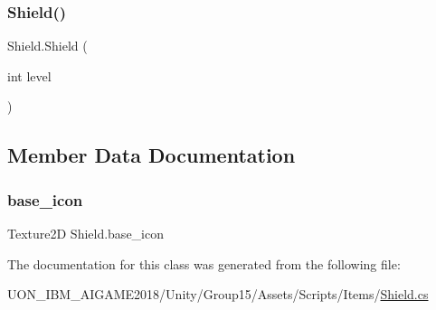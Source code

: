 \subsubsection{\texorpdfstring{Shield()}{Shield()}}
{\footnotesize\ttfamily Shield.\+Shield (\begin{DoxyParamCaption}\item[{int}]{level }\end{DoxyParamCaption})\hspace{0.3cm}{\ttfamily [inline]}}



\subsection{Member Data Documentation}
\mbox{\label{class_shield_ad5d63280a29e5ddd4a42d34533372e33}} 
\subsubsection{\texorpdfstring{base\_icon}{base\_icon}}
{\footnotesize\ttfamily Texture2D Shield.\+base\+\_\+icon\hspace{0.3cm}{\ttfamily [static]}}



The documentation for this class was generated from the following file\+:\begin{DoxyCompactItemize}
\item 
U\+O\+N\+\_\+\+I\+B\+M\+\_\+\+A\+I\+G\+A\+M\+E2018/\+Unity/\+Group15/\+Assets/\+Scripts/\+Items/\mbox{\hyperlink{_shield_8cs}{Shield.\+cs}}\end{DoxyCompactItemize}
